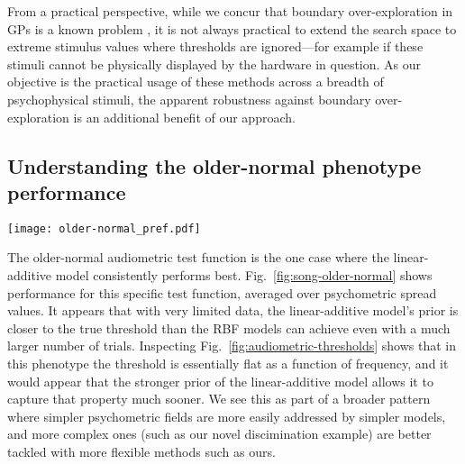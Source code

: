 \documentclass[../main.tex]{subfiles}
\begin{document}
From a practical perspective, while we concur that boundary over-exploration in GPs is a known problem \citep[e.g.][]{Siivola2018}, it is not always practical to extend the search space to extreme stimulus values where thresholds are ignored---for example if these stimuli cannot be physically displayed by the hardware in question. As our objective is the practical usage of these methods across a breadth of psychophysical stimuli, the apparent robustness against boundary over-exploration is an additional benefit of our approach.

\subsection{Understanding the older-normal phenotype performance}

\begin{figure*}[!htb]
    \centering
    \texttt{[image: older-normal\_pref.pdf]}
    \caption{\textbf{Older-normal audiometric test function performance}. Performance is averaged over psychometric spread values. LSE is the best for acquisition in terms of error in both threshold (\emph{left}), and response probability (\emph{right}). The linear-additive model performs far better than the RBF models in this setting, and this performance gap exists from the beginning of sampling, consistent with the idea that this model's prior puts much more probability mass on this test function, which is relatively simpler. Shaded intervals are a 0.95 confidence interval over simulations.}
    \label{fig:song-older-normal}
\end{figure*}

The older-normal audiometric test function is the one case where the linear-additive model consistently performs best. Fig.~\ref{fig:song-older-normal} shows performance for this specific test function, averaged over psychometric spread values. It appears that with very limited data, the linear-additive model's prior is closer to the true threshold than the RBF models can achieve even with a much larger number of trials. Inspecting Fig.~\ref{fig:audiometric-thresholds} shows that in this phenotype the threshold is essentially flat as a function of frequency, and it would appear that the stronger prior of the linear-additive model allows it to capture that property much sooner. We see this as part of a broader pattern where simpler psychometric fields are more easily addressed by simpler models, and more complex ones (such as our novel discimination example) are better tackled with more flexible methods such as ours.
\end{document}
